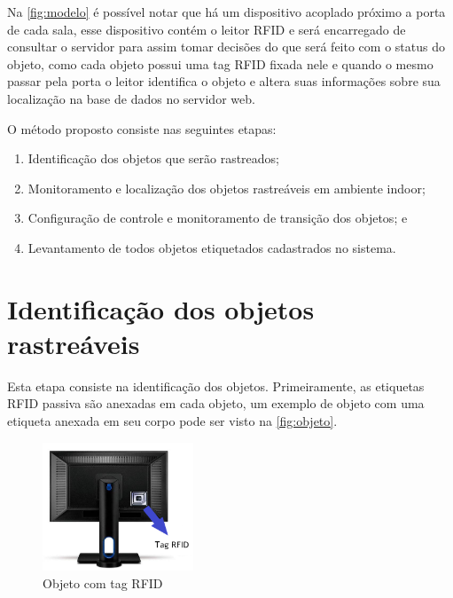 \par
Na \autoref{fig:modelo} é possível notar que há um dispositivo acoplado próximo a
porta de cada sala, esse dispositivo contém o leitor RFID e será encarregado de consultar o
servidor para assim tomar decisões do que será feito com o status do objeto, como cada objeto possui uma tag RFID fixada
nele e quando o mesmo passar pela porta o leitor identifica o objeto e altera suas informações sobre sua localização na base de dados no servidor web.

\par
O método proposto consiste nas seguintes etapas:
\begin{enumerate}
    \item Identificação dos objetos que serão rastreados;
    \item Monitoramento e localização dos objetos rastreáveis em ambiente indoor; 
    \item Configuração de controle e monitoramento de transição dos objetos; e
    \item Levantamento de todos objetos etiquetados cadastrados no sistema.
\end{enumerate}

%
%
\section{Identificação dos objetos rastreáveis}

Esta etapa consiste na identificação dos objetos. Primeiramente, as etiquetas RFID passiva são anexadas em cada objeto, um exemplo de objeto com uma etiqueta anexada em seu corpo pode ser visto na \autoref{fig:objeto}.
\begin{figure}[H]
              \caption{\label{fig:objeto}{Objeto com tag RFID}}
              \centering
              \includegraphics[width=0.4\textwidth]{Figuras/monitor.png}
\end{figure}

